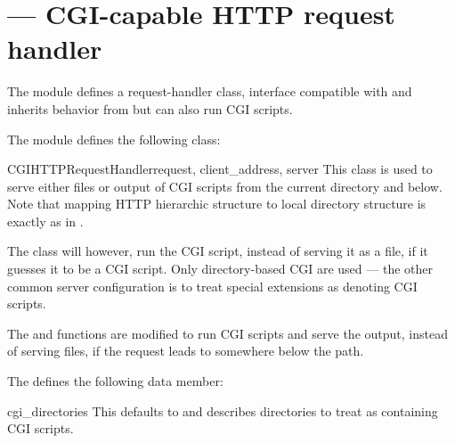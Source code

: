 \section{ ---
         CGI-capable HTTP request handler}




The  module defines a request-handler class,
interface compatible with
 and inherits behavior
from  but can also
run CGI scripts.



The  module defines the following class:

\begin{classdesc}{CGIHTTPRequestHandler}{request, client_address, server}
This class is used to serve either files or output of CGI scripts from 
the current directory and below. Note that mapping HTTP hierarchic
structure to local directory structure is exactly as in
.

The class will however, run the CGI script, instead of serving it as a
file, if it guesses it to be a CGI script. Only directory-based CGI
are used --- the other common server configuration is to treat special
extensions as denoting CGI scripts.

The  and  functions are
modified to run CGI scripts and serve the output, instead of serving
files, if the request leads to somewhere below the
 path.
\end{classdesc}

The  defines the following data member:

\begin{memberdesc}{cgi_directories}
This defaults to  and describes
directories to treat as containing CGI scripts.
\end{memberdesc}

